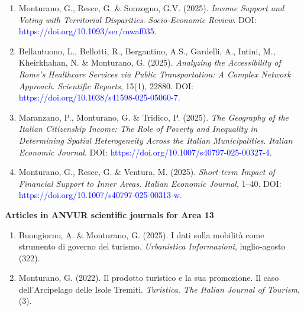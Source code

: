 \documentclass[11pt,a4paper,sans]{moderncv} %
\begin{document}
\begin{enumerate}[label=\arabic*.]
\item Monturano, G., Resce, G. \& Sonzogno, G.V. (2025). \textit{Income Support and Voting with Territorial Disparities}. \textit{Socio-Economic Review}. DOI: \textcolor{blue}{https://doi.org/10.1093/ser/mwaf035}.

\item Bellantuono, L., Bellotti, R., Bergantino, A.S., Gardelli, A., Intini, M., Kheirkhahan, N. \& Monturano, G. (2025). \textit{Analyzing the Accessibility of Rome's Healthcare Services via Public Transportation: A Complex Network Approach}. \textit{Scientific Reports}, 15(1), 22880. DOI: \textcolor{blue}{https://doi.org/10.1038/s41598-025-05060-7}.

\item Maranzano, P., Monturano, G. \& Tridico, P. (2025). \textit{The Geography of the Italian Citizenship Income: The Role of Poverty and Inequality in Determining Spatial Heterogeneity Across the Italian Municipalities}. \textit{Italian Economic Journal}. DOI: \textcolor{blue}{https://doi.org/10.1007/s40797-025-00327-4}.

\item Monturano, G., Resce, G. \& Ventura, M. (2025). \textit{Short-term Impact of Financial Support to Inner Areas}. \textit{Italian Economic Journal}, 1--40. DOI: \textcolor{blue}{https://doi.org/10.1007/s40797-025-00313-w}.

\end{enumerate}



\textbf{Articles in ANVUR scientific journals for Area 13} 
\begin{enumerate}[label=\arabic*.]


    \item Buongiorno, A. \& Monturano, G. (2025). I dati sulla mobilità come strumento di governo del turismo. \textit{Urbanistica Informazioni}, luglio-agosto (322).
    
    \item Monturano, G. (2022). Il prodotto turistico e la sua promozione. Il caso dell’Arcipelago delle Isole Tremiti. \textit{Turistica. The Italian Journal of Tourism}, (3).
\end{enumerate}
\end{document}
